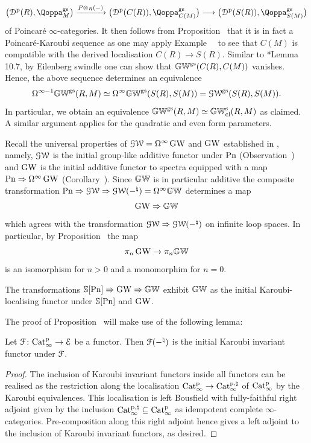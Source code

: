 \begin{remark}
\[
\bigl(\Dperf(R),\QF^{\gs}_M\bigr) \xrightarrow{P\otimes_R (-)} \bigl(\Dperf(C(R)),\QF^{\gs}_{C(M)}\bigr) \longrightarrow \bigl(\Dperf(S(R)),\QF^{\gs}_{S(M)}\bigr)
\]
of Poincaré $\infty$-categories. It then follows from Proposition~ that it is in fact a Poincar\'e-Karoubi sequence as one may apply Example~~ to see that $C(M)$ is compatible with the derived localisation $C(R) \to S(R)$.
Similar to \cite{schlichting-mv}*{Lemma 10.7}, by Eilenberg swindle one can show that $\mathbb{GW}^{\mathrm{gs}}(C(R),C(M))$ vanishes. Hence, the above sequence determines an equivalence
\[
\Omega^{\infty-1}\mathbb{GW}^{\mathrm{gs}}(R,M) \simeq \Omega^{\infty}\mathbb{GW}^{\mathrm{gs}}(S(R),S(M)) = \operatorname{\mathcal{GW}}^{\mathrm{gs}}(S(R),S(M)).
\]
In particular, we obtain an equivalence $\mathbb{GW}^{\mathrm{gs}}(R,M) \simeq \mathbb{GW}_{\mathrm{cl}}^{\mathrm{s}}(R,M)$
as claimed. A similar argument applies for the quadratic and even form parameters.
\end{remark}



Recall the universal properties of $\operatorname{\mathcal{GW}} = \Omega^{\infty}\operatorname{GW}$ and $\operatorname{GW}$ established in \papertwo, namely, $\operatorname{\mathcal{GW}}$ is the initial group-like additive functor under $\mathrm{Pn}$ (Observation~) and $\operatorname{GW}$ is the initial additive functor to spectra equipped with a map $\mathrm{Pn} \Rightarrow \Omega^\infty\operatorname{GW}$ (Corollary~). %
Since $\mathbb{GW}$ is in particular additive the composite transformation $\mathrm{Pn} \Rightarrow \operatorname{\mathcal{GW}}\Rightarrow \operatorname{\mathcal{GW}}(-^\natural) = \Omega^\infty \mathbb{GW}$ determines a map
\[
\operatorname{GW}\Rightarrow \mathbb{GW}
\]
which agrees with the transformation $\operatorname{\mathcal{GW}}\Rightarrow\operatorname{\mathcal{GW}}(-^\natural)$ on infinite loop spaces.
In particular, by Proposition~ the map
\[
\pi_n \operatorname{GW} \to \pi_n \mathbb{GW}
\]
is an isomorphism for $n>0$ and a monomorphim for $n=0$. 

\begin{proposition}
\label{proposition:universal-KGW}%
The transformations $\mathbb{S}[\mathrm{Pn}] \Rightarrow \operatorname{GW}\Rightarrow \mathbb{GW}$ exhibit $\mathbb{GW}$ as the initial Karoubi-localising functor under $\mathbb{S}[\mathrm{Pn}]$ and $\operatorname{GW}$.
\end{proposition}

The proof of Proposition~ will make use of the following lemma:
\begin{lemma}
\label{lemma:idem-invariant}%
Let $\mathcal{F}\colon \mathrm{Cat}^{\mathrm p}_\infty \to \mathcal{E}$ be a functor. Then $\mathcal{F}(-^\natural)$ is the initial Karoubi invariant functor under $\mathcal{F}$.
\end{lemma}
\begin{proof}
The inclusion of Karoubi invariant functors inside all functors can be realised as the restriction along the localisation $\mathrm{Cat}^{\mathrm p}_\infty \to\mathrm{Cat}^{\mathrm p,\natural}_{\infty}$ of $\mathrm{Cat}^{\mathrm p}_\infty$ by the Karoubi equivalences. This localisation is left Bousfield with fully-faithful right adjoint given by the inclusion $\mathrm{Cat}^{\mathrm p,\natural}_{\infty} \subseteq \mathrm{Cat}^{\mathrm p}_\infty$ as idempotent complete $\infty$-categories. Pre-composition along this right adjoint hence gives a left adjoint to the inclusion of Karoubi invariant functors, as desired.
\end{proof}


